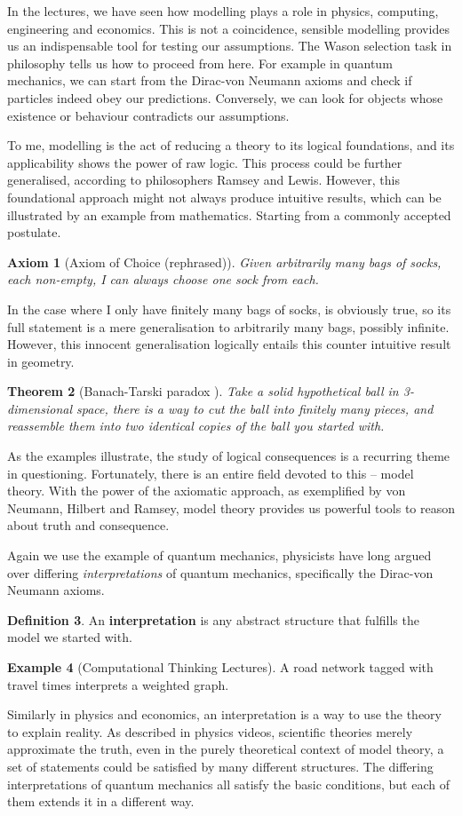 \documentclass[british,a4paper,]{article}
\newtheorem{theorem}{Theorem}
\newtheorem{axiom}[theorem]{Axiom}
\theoremstyle{definition}
\newtheorem{definition}[theorem]{Definition}
\newtheorem{example}[theorem]{Example}
\theoremstyle{remark}
\begin{document}
In the lectures, we have seen how modelling plays a role in physics, computing, engineering and economics.
This is not a coincidence, sensible modelling provides us an indispensable tool for testing our assumptions.
The Wason selection task in philosophy tells us how to proceed from here.
For example in quantum mechanics, we can start from the Dirac-von Neumann axioms and check if particles indeed obey our predictions.
Conversely, we can look for objects whose existence or behaviour contradicts our assumptions.

To me, modelling is the act of reducing a theory to its logical foundations, and its applicability shows the power of raw logic.
This process could be further generalised, according to philosophers Ramsey and Lewis\autocite{lewis1970}.
However, this foundational approach might not always produce intuitive results, which can be illustrated by an example from mathematics.
Starting from a commonly accepted postulate.
\begin{axiom}[Axiom of Choice (rephrased)] \label{AC}
    Given arbitrarily many bags of socks, each non-empty, I can \emph{always}
    choose one sock from each.
\end{axiom}
In the case where I only have finitely many bags of socks,  is obviously true,
so its full statement is a mere generalisation to arbitrarily many bags, possibly infinite.
However, this innocent generalisation logically entails this counter intuitive result in geometry.
\begin{theorem}[Banach-Tarski paradox \autocite{banachtarski}]
    Take a solid hypothetical ball in 3-dimensional space,
    there is a way to cut the ball into finitely many pieces,
    and reassemble them into two identical copies of the ball you started with.
\end{theorem}

As the examples illustrate, the study of logical consequences is a recurring theme in questioning.
Fortunately, there is an entire field devoted to this -- model theory.
With the power of the axiomatic approach, as exemplified by von Neumann, Hilbert and Ramsey,
model theory provides us powerful tools to reason about truth and consequence.

Again we use the example of quantum mechanics,
physicists have long argued over differing \emph{interpretations} of quantum mechanics, specifically the Dirac-von Neumann axioms.
\begin{definition}
    An \textbf{interpretation} is any abstract structure that fulfills the model we started with.
\end{definition}
\begin{example}[Computational Thinking Lectures]
    A road network tagged with travel times interprets a weighted graph.
\end{example}
Similarly in physics and economics, an interpretation is a way to use the theory to explain reality.
As described in physics videos, scientific theories merely approximate the truth,
even in the purely theoretical context of model theory, a set of statements could be satisfied by many different structures.
The differing interpretations of quantum mechanics all satisfy the basic conditions, but each of them extends it in a different way.
\end{document}
